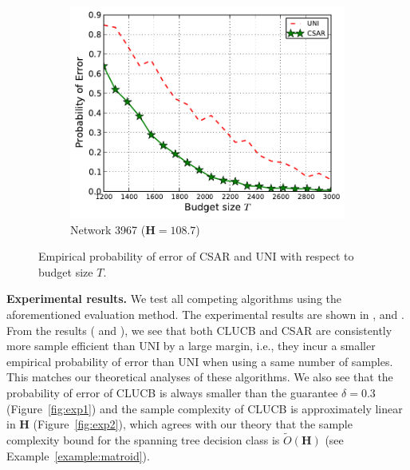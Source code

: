 \documentclass{article}
\newcommand{\Algorithm}{{\small \textsf{CLUCB}}\xspace}
\newcommand{\AlgorithmBud}{{\small \textsf{CSAR}}\xspace}
\newcommand{\Uniform}{{\small \textsf{UNI}}\xspace}
\newcommand{\Problem}{{CPE}\xspace}
\begin{document}
\begin{figure}[htbp]
\begin{subfigure}[c]{\imgsize\textwidth}
	\includegraphics[width=\textwidth]{fig/exp/mst-3967}
	\caption{Network 3967 ($\mathbf H=108.7$)}
\end{subfigure}
\caption{Empirical probability of error of \AlgorithmBud and \Uniform with respect to budget size $T$.}
\label{fig:exp3}
\end{figure}



\textbf{Experimental results.}
We test all competing algorithms using the aforementioned evaluation method.
The experimental results are shown in ,  and .
From the results ( and ), we see that both \Algorithm and \AlgorithmBud are consistently more sample efficient than \Uniform by a large margin, i.e., they incur a smaller empirical probability of error than \Uniform when using a same number of samples.
This matches our theoretical analyses of these algorithms.
We also see that the probability of error of \Algorithm is always smaller than the guarantee $\delta=0.3$ (Figure~\ref{fig:exp1}) and the sample complexity of \Algorithm is approximately linear in $\mathbf H$ (Figure~\ref{fig:exp2}), which agrees with our theory that the sample complexity bound for the spanning tree decision class is $\tilde O(\mathbf H)$ (see Example~\ref{example:matroid}).



\end{document}
